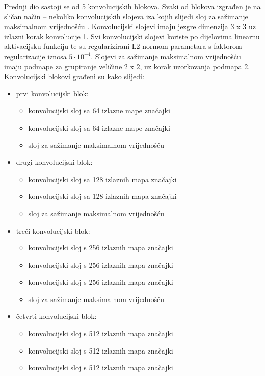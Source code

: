 \documentclass[times, utf8, diplomski, numeric]{fer}
\begin{document}
Prednji dio sastoji se od 5 konvolucijskih blokova. 
Svaki od blokova izgrađen je na sličan način -- nekoliko konvolucijskih slojeva iza kojih slijedi sloj za sažimanje maksimalnom vrijednošću .
Konvolucijski slojevi imaju jezgre dimenzija $3$ x $3$ uz izlazni korak konvolucije  1. 
Svi konvolucijski slojevi koriste po dijelovima linearnu aktivacijsku funkciju  te su regularizirani L2 normom parametara s faktorom regularizacije iznosa $5\cdot10^{-4}$.
Slojevi za sažimanje maksimalnom vrijednošću imaju podmape za grupiranje veličine $2$ x $2$, uz korak uzorkovanja podmapa 2.
Konvolucijski blokovi građeni su kako slijedi:
\begin{itemize}
 \item prvi konvolucijski blok:
 \begin{itemize}
  \item konvolucijski sloj sa 64 izlazne mape značajki
  \item konvolucijski sloj sa 64 izlazne mape značajki
  \item sloj za sažimanje maksimalnom vrijednošću
 \end{itemize}
  \item drugi konvolucijski blok:
 \begin{itemize}
  \item konvolucijski sloj sa 128 izlaznih mapa značajki
  \item konvolucijski sloj sa 128 izlaznih mapa značajki
  \item sloj za sažimanje maksimalnom vrijednošću
 \end{itemize}
   \item treći konvolucijski blok:
 \begin{itemize}
  \item konvolucijski sloj s 256 izlaznih mapa značajki
  \item konvolucijski sloj s 256 izlaznih mapa značajki
  \item konvolucijski sloj s 256 izlaznih mapa značajki
  \item sloj za sažimanje maksimalnom vrijednošću
 \end{itemize}
    \item četvrti konvolucijski blok:
 \begin{itemize}
  \item konvolucijski sloj s 512 izlaznih mapa značajki
  \item konvolucijski sloj s 512 izlaznih mapa značajki
  \item konvolucijski sloj s 512 izlaznih mapa značajki

\end{itemize}
\end{itemize}
\end{document}
